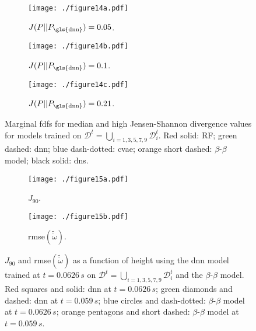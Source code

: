 \documentclass[review]{elsarticle}
\newcommand{\wt}[1]{\widetilde{#1}}
\begin{document}
\clearpage\newpage
\begin{figure}[!tbp]%
  \centering%
  \begin{subfigure}[t]{\textwidth}%
    \texttt{[image: ./figure14a.pdf]}%
    \caption{$J(P||P_{\text{\gls{dnn}}})=0.05$.}\label{fig:}%
  \end{subfigure}\hfill%
  \begin{subfigure}[t]{\textwidth}%
    \texttt{[image: ./figure14b.pdf]}%
    \caption{$J(P||P_{\text{\gls{dnn}}})=0.1$.}\label{fig:}%
  \end{subfigure}\hfill%
  \begin{subfigure}[t]{\textwidth}%
    \texttt{[image: ./figure14c.pdf]}%
    \caption{$J(P||P_{\text{\gls{dnn}}})=0.21$.}\label{fig:pdfs_skip_3}%
  \end{subfigure}%
  \caption{Marginal \glspl{fdf} for median and high Jensen-Shannon divergence values for models trained on $\mathcal{D}^t = \bigcup\limits_{i=1, 3, 5, 7, 9} \mathcal{D}_i^t$. Red solid: RF; green dashed: \gls{dnn}; blue dash-dotted: \gls{cvae}; orange short dashed: $\beta$-$\beta$ model; black solid: \gls{dns}.}\label{fig:pdfs_skip}%
\end{figure}%

\clearpage\newpage
\begin{figure}[!tbp]%
  \centering%
  \begin{subfigure}[t]{0.48\textwidth}%
    \texttt{[image: ./figure15a.pdf]}%
    \caption{$J_{90}$.}%
  \end{subfigure}\hfill%
  \begin{subfigure}[t]{0.48\textwidth}%
    \texttt{[image: ./figure15b.pdf]}%
    \caption{\gls{rmse}$(\wt{\dot{\omega}})$.}%
  \end{subfigure}%
  \caption{$J_{90}$ and \gls{rmse}$(\wt{\dot{\omega}})$ as a function
    of height using the \gls{dnn} model trained at
    $t=0.0626\,\unit{s}$ on
    $\mathcal{D}^t = \bigcup\limits_{i=1, 3, 5, 7, 9} \mathcal{D}_i^t$
    and the $\beta$-$\beta$ model. Red squares and solid: \gls{dnn} at
    $t=0.0626\,\unit{s}$; green diamonds and dashed: \gls{dnn} at
    $t=0.059\,\unit{s}$; blue circles and dash-dotted:
    $\beta$-$\beta$ model at $t=0.0626\,\unit{s}$; orange pentagons
    and short dashed: $\beta$-$\beta$ model at
    $t=0.059\,\unit{s}$.}\label{fig:prediction_comp_1030}%
\end{figure}%
\end{document}
